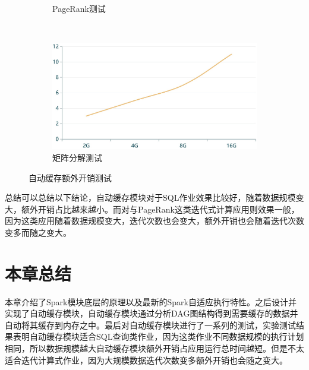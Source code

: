\begin{figure}[!htbp]
\begin{subfigure}[b]{0.45\linewidth}
      \caption{PageRank测试}
      \label{fig:pagerank-ac-2}
    \end{subfigure}%
    ~%
    \begin{subfigure}[b]{0.45\linewidth}
      \includegraphics[width=\textwidth]{Img/matrix-ac-2.jpg}
      \caption{矩阵分解测试}
      \label{fig:matrix-ac-2}
    \end{subfigure}
    \caption{自动缓存额外开销测试}
    \label{fig:autocache-2}
\end{figure}

总结可以总结以下结论，自动缓存模块对于SQL作业效果比较好，随着数据规模变大，额外开销占比越来越小。而对与PageRank这类迭代式计算应用则效果一般，因为这类应用随着数据规模变大，迭代次数也会变大，额外开销也会随着迭代次数变多而随之变大。

\section{本章总结}

本章介绍了Spark模块底层的原理以及最新的Spark自适应执行特性。之后设计并实现了自动缓存模块，自动缓存模块通过分析DAG图结构得到需要缓存的数据并自动将其缓存到内存之中。最后对自动缓存模块进行了一系列的测试，实验测试结果表明自动缓存模块适合SQL查询类作业，因为这类作业不同数据规模的执行计划相同，所以数据规模越大自动缓存模块额外开销占应用运行总时间越短。但是不太适合迭代计算式作业，因为大规模数据迭代次数变多额外开销也会随之变大。

